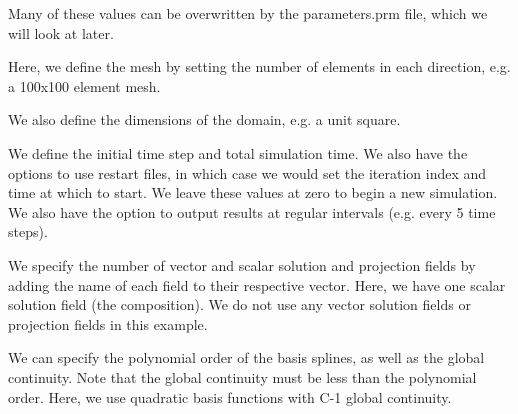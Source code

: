 Many of these values can be overwritten by the parameters.\-prm file, which we will look at later.


\begin{DoxyCodeInclude}

\end{DoxyCodeInclude}


Here, we define the mesh by setting the number of elements in each direction, e.\-g. a 100x100 element mesh.


\begin{DoxyCodeInclude}

\end{DoxyCodeInclude}


We also define the dimensions of the domain, e.\-g. a unit square.


\begin{DoxyCodeInclude}

\end{DoxyCodeInclude}


We define the initial time step and total simulation time. We also have the options to use restart files, in which case we would set the iteration index and time at which to start. We leave these values at zero to begin a new simulation. We also have the option to output results at regular intervals (e.\-g. every 5 time steps).


\begin{DoxyCodeInclude}

\end{DoxyCodeInclude}


We specify the number of vector and scalar solution and projection fields by adding the name of each field to their respective vector. Here, we have one scalar solution field (the composition). We do not use any vector solution fields or projection fields in this example.


\begin{DoxyCodeInclude}

\end{DoxyCodeInclude}


We can specify the polynomial order of the basis splines, as well as the global continuity. Note that the global continuity must be less than the polynomial order. Here, we use quadratic basis functions with C-\/1 global continuity.


\begin{DoxyCodeInclude}

\end{DoxyCodeInclude}


